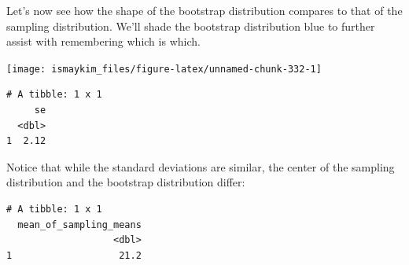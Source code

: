 \documentclass[12pt,]{krantz}
\makeatletter
\newenvironment{Shaded}{\begin{snugshade}}{\end{snugshade}}
\newcommand{\KeywordTok}[1]{\textcolor[rgb]{0.27,0.27,0.27}{\textbf{#1}}}
\newcommand{\DataTypeTok}[1]{\textcolor[rgb]{0.27,0.27,0.27}{#1}}
\newcommand{\DecValTok}[1]{\textcolor[rgb]{0.06,0.06,0.06}{#1}}
\newcommand{\StringTok}[1]{\textcolor[rgb]{0.5,0.5,0.5}{#1}}
\newcommand{\OperatorTok}[1]{\textcolor[rgb]{0.43,0.43,0.43}{\textbf{#1}}}
\newcommand{\NormalTok}[1]{#1}
\newenvironment{kframe}{%
\medskip{}
\setlength{\fboxsep}{.8em}
 \def\at@end@of@kframe{}%
 \ifinner\ifhmode%
  \def\at@end@of@kframe{\end{minipage}}%
  \begin{minipage}{\columnwidth}%
 \fi\fi%
 \def\FrameCommand##1{\hskip\@totalleftmargin \hskip-\fboxsep
 \colorbox{shadecolor}{##1}\hskip-\fboxsep
     \hskip-\linewidth \hskip-\@totalleftmargin \hskip\columnwidth}%
 \MakeFramed {\advance\hsize-\width
   \@totalleftmargin\z@ \linewidth\hsize
   \@setminipage}}%
 {\par\unskip\endMakeFramed%
 \at@end@of@kframe}
\renewenvironment{Shaded}{\begin{kframe}}{\end{kframe}}
\theoremstyle{definition}
\theoremstyle{definition}
\theoremstyle{definition}
\theoremstyle{remark}
\makeatother
\begin{document}
Let's now see how the shape of the bootstrap distribution compares to
that of the sampling distribution. We'll shade the bootstrap
distribution blue to further assist with remembering which is which.

\begin{Shaded}
\end{Shaded}

\begin{center}\texttt{[image: ismaykim\_files/figure-latex/unnamed-chunk-332-1]} \end{center}

\begin{Shaded}
\end{Shaded}

\begin{verbatim}
# A tibble: 1 x 1
     se
  <dbl>
1  2.12
\end{verbatim}

Notice that while the standard deviations are similar, the center of the
sampling distribution and the bootstrap distribution differ:

\begin{Shaded}
\end{Shaded}

\begin{verbatim}
# A tibble: 1 x 1
  mean_of_sampling_means
                   <dbl>
1                   21.2
\end{verbatim}

\begin{Shaded}
\end{Shaded}
\end{document}
